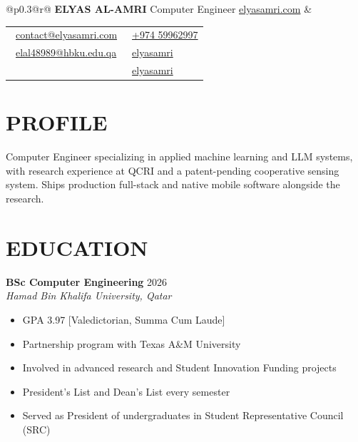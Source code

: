 \documentclass[11pt,a4paper]{article}
\begin{document}
\begin{tabular*}{\textwidth}{@{}p{}@{\extracolsep{\fill}}r@{}}
    \textbf{\Large ELYAS AL-AMRI} \newline
    Computer Engineer \newline
    \href{https://elyasamri.com}{elyasamri.com} &
    \begin{tabular}[t]{@{}l@{\hspace{2em}}l@{}}
        \faEnvelope\ \href{mailto:contact@elyasamri.com}{contact@elyasamri.com} & \faPhone\ \href{tel:+97459962997}{+974 59962997} \\
        \faEnvelope\ \href{mailto:elal48989@hbku.edu.qa}{elal48989@hbku.edu.qa} & \faGithub\ \href{https://github.com/elyasamri}{elyasamri} \\
        & \faLinkedin\ \href{https://linkedin.com/in/elyasamri}{elyasamri}
    \end{tabular}
\end{tabular*}

\section*{PROFILE}
Computer Engineer specializing in applied machine learning and LLM systems, with research experience at QCRI and a patent-pending cooperative sensing system. Ships production full-stack and native mobile software alongside the research.

\section*{EDUCATION}

\textbf{BSc Computer Engineering} \hfill 2026 \\
\textit{Hamad Bin Khalifa University, Qatar}
\begin{itemize}[leftmargin=2em, nosep, label={}]
    \item GPA 3.97 [Valedictorian, Summa Cum Laude]
    \item Partnership program with Texas A\&M University
    \item Involved in advanced research and Student Innovation Funding projects
    \item President's List and Dean's List every semester
    \item Served as President of undergraduates in Student Representative Council (SRC)
\end{itemize}


\end{document}
